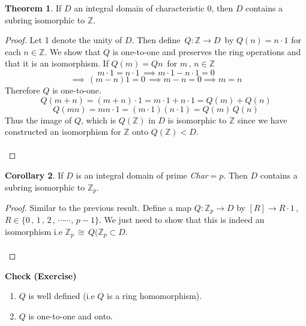 \documentclass[11pt,a4paper]{article}
\theoremstyle{definition}
\newtheorem{thm}{Theorem}[subsection]
\newtheorem{coro}[thm]{Corollary}
\begin{document}
\begin{thm}
If $D$ an integral domain of characteristic 0, then $D$ contains a subring isomorphic to $\mathbb{Z}$.\\
\end{thm}



\begin{proof}
Let 1 denote the unity of $D$. Then define $\,Q :\mathbb{Z} \longrightarrow D\,$ by $Q(n) = n\cdot 1$ for each $n\in \mathbb{Z}$. We show that $Q$ is one-to-one and preserves the ring operations and that it is an isomorphism.  If $Q(m) = Q n\,$ for $m\, ,\, n\in \mathbb{Z}$
$$m\cdot 1 = n\cdot 1\, \implies m\cdot 1  - n\cdot 1 = 0$$
$$\implies\, (m - n)1 = 0\,  \implies m - n = 0\implies m = n$$
Therefore $Q$ is one-to-one.
$$Q(m + n) = (m + n)\cdot 1 = m\cdot 1 + n\cdot 1 = Q(m) + Q(n)$$
$$Q(mn) = mn\cdot 1 = (m\cdot 1)(n\cdot 1) = Q(m)\, Q(n)$$
Thus the image of $Q$, which is $Q(\mathbb{Z})$ in $D$ is isomorphic to $\mathbb{Z}$ since we have constructed an isomorphism for $\mathbb{Z}$ onto $Q(\mathbb{Z}) < D$.
\\\\
\end{proof}







\begin{coro}
If $D$ is an integral domain of prime \textit{Char}$ = p$. Then $D$ contains a subring isomorphic to $\mathbb{Z}_p$.\\
\end{coro}


\begin{proof}
Similar to the previous result. Define a map $Q :\mathbb{Z}_p \longrightarrow D$ by $[R] \longrightarrow R\cdot 1\, , \,\,$\\ $ R\in \{0\, , \, 1\, , \, 2\, , \, \cdots\cdots,\, p - 1\}$. We just need to show that this is indeed an isomorphism i.e $\mathbb{Z}_p \, \cong \, Q(\mathbb{Z}_p\subset D$.\\\\
\end{proof}



\textbf{Check (Exercise)}
\begin{enumerate}
\item $Q$ is well defined (i.e $Q$ is a  ring homomorphism).
\item $Q$ is one-to-one and onto.\\\\\
\end{enumerate}
\end{document}
